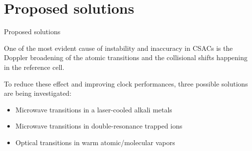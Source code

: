\section{Proposed solutions}

\begin{frame}{Proposed solutions}

    One of the most evident cause of instability and inaccuracy in CSACs is the Doppler broadening of the atomic transitions and the collisional shifts happening in the reference cell.

    \vspace{10pt}

    To reduce these effect and improving clock performances, three possible solutions are being investigated:

    \begin{itemize}
        \item Microwave transitions in a laser-cooled alkali metals
        \item Microwave transitions in double-resonance trapped ions
        \item Optical transitions in warm atomic/molecular vapors
    \end{itemize}

\end{frame}



